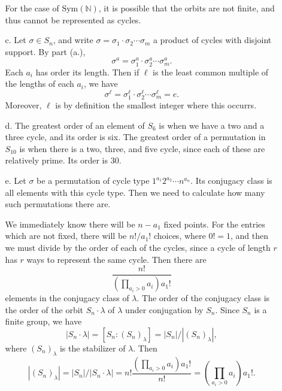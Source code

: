 \documentclass[11pt, reqno]{article}
\theoremstyle{plain}
\theoremstyle{definition}
\theoremstyle{remark}
\newcommand{\NN}{\mathbb{N}}
\begin{document}
\begin{enumerate}
\begin{enumerate}
        For the case of $\text{Sym}(\NN)$, it is possible that the orbits are not finite, and thus cannot be represented as 
        cycles.

        \item[c.] Let $\sigma \in S_n$, and write $\sigma = \sigma_1\cdot \sigma_2 \cdots \sigma_m$ a product of cycles
        with disjoint support. By part (a.), 
        \[
            \sigma^a = \sigma_1^a\cdot \sigma_2^a \cdots \sigma_m^a.
        \]
        Each $a_i$ has order its length. Then if $\ell$ is the least common multiple of the lengths of each 
        $a_i$, we have 
        \[
            \sigma^\ell = \sigma_1^\ell\cdot \sigma_2^\ell\cdots\sigma_m^\ell = e.
        \]
        Moreover, $\ell$ is by definition the smallest integer where this occurrs. 

        \item[d.] The greatest order of an element of $S_6$ is when we have a two and a three cycle, and its order is six.
        The greatest order of a permutation in $S_{10}$ is when there is a two, three, and five cycle, since each of these
        are relatively prime. Its order is $30$.

        \item[e.] Let $\sigma$ be a permutation of cycle type $1^{a_1}2^{a_2}\cdots n^{a_n}$. Its conjugacy class is 
        all elements with this cycle type. Then we need to calculate how many such permutations there are. 

        We immediately know there will be $n-a_1$ fixed points. For the entries which are not fixed, there will be 
        $n!/a_1!$ choices, where $0! = 1$, and then we must divide by the order of each of the cycles, since 
        a cycle of length $r$ has $r$ ways to represent the same cycle. Then there are 
        \[
            \frac{n!}{\left(\prod_{a_i > 0} a_i\right)a_1!}
        \]
        elements in the conjugacy class of $\lambda$.
        \bigbreak
        The order of the conjugacy class is the order of the orbit $S_n\cdot \lambda$ of $\lambda$ under conjugation by $S_n$. 
        Since $S_n$ is a finite group, we have 
        \[
            |S_n\cdot \lambda| = [S_n : (S_n)_\lambda] = |S_n|/|(S_n)_\lambda|,
        \]
        where $(S_n)_\lambda$ is the stabilizer of $\lambda$. Then 
        \[
            |(S_n)_\lambda| = |S_n|/|S_n\cdot \lambda| = n!\frac{\left(\prod_{a_i > 0} a_i\right)a_1!}{n!} = \left(\prod_{a_i > 0} a_i\right)a_1!.
        \]
    \end{enumerate}


\end{enumerate}
\end{document}
